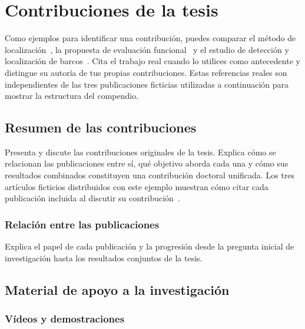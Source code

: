 %

\chapter{Contribuciones de la tesis}
\label{cha:compendium-contributions}

Como ejemplos para identificar una contribución, puedes comparar el método de localización~\cite{Sanabria2026Landmark}, la propuesta de evaluación funcional~\cite{nieva2024proposal} y el estudio de detección y localización de barcos~\cite{ramirez2026jstars}. Cita el trabajo real cuando lo utilices como antecedente y distingue su autoría de tus propias contribuciones. Estas referencias reales son independientes de las tres publicaciones ficticias utilizadas a continuación para mostrar la estructura del compendio.

\section{Resumen de las contribuciones}

Presenta y discute las contribuciones originales de la tesis. Explica cómo se relacionan las publicaciones entre sí, qué objetivo aborda cada una y cómo sus resultados combinados constituyen una contribución doctoral unificada. Los tres artículos ficticios distribuidos con este ejemplo muestran cómo citar cada publicación incluida al discutir su contribución~\cite{garcia2026paper1,garcia2026paper2,garcia2026paper3}.

\subsection{Relación entre las publicaciones}

Explica el papel de cada publicación y la progresión desde la pregunta inicial de investigación hasta los resultados conjuntos de la tesis.

\section{Material de apoyo a la investigación}
\subsection{Vídeos y demostraciones}

